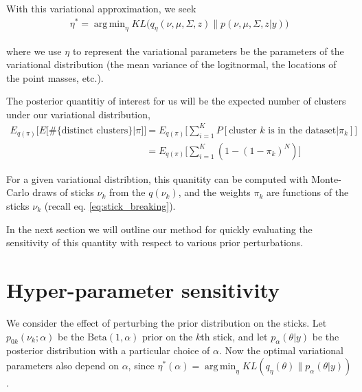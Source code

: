 \documentclass[a4paper]{article}
\DeclareMathOperator*{\argmin}{arg\,min}
\begin{document}
With this variational approximation, we seek
\begin{align}
\eta^* = \argmin_{\eta} KL\Big(q_\eta(\nu, \mu, \Sigma, z) \big\| p(\nu, \mu, \Sigma, z | y)\Big) \label{eq:kl_objective}
\end{align}

where we use $\eta$ to represent the variational parameters be the parameters of the variational distribution
(the mean variance of the logitnormal, the locations of the point masses, etc.).

The posterior quantitiy of interest for us will be the expected number of
clusters under our variational distribution,
\begin{align}
  E_{q(\pi)}\Big[E\Big[\#\{\text{distinct clusters}\}|\pi\Big]\Big] &=
  E_{q(\pi)}\Big[\sum_{i=1}^K P[\text{cluster $k$ is in the dataset}|\pi_k]\Big] \\
    &= E_{q(\pi)} \Big[\sum_{i=1}^K (1 - (1 - \pi_k)^N)\Big]
    \label{eq:expected_num_clusters}
\end{align}

For a given variational distribtion, this quanitity can be computed with
Monte-Carlo draws of sticks $\nu_k$ from the $q(\nu_k)$, and the weights $\pi_k$
are functions of the sticks $\nu_k$ (recall eq. \ref{eq:stick_breaking}).

In the next section we will outline our method for quickly evaluating the
sensitivity of this quantity with respect to various prior perturbations.

%

\section{Hyper-parameter sensitivity}

We consider the effect of perturbing the prior distribution on the sticks.
Let $p_{0k}(\nu_k; \alpha)$ be the $\text{Beta}(1, \alpha)$ prior on the $k$th stick, and
let $p_{\alpha}(\theta | y)$ be the posterior distribution with a particular choice of $\alpha$.
Now the optimal variational parameters also depend on $\alpha$, since $\eta^*(\alpha) =
\argmin_\eta KL(q_\eta\left(\theta\right) \| p_{\alpha}(\theta | y))$.
\end{document}
